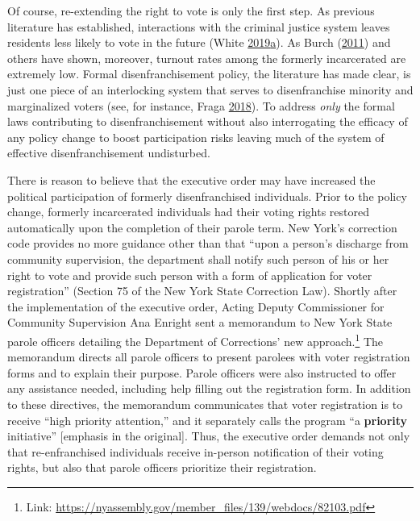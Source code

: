\documentclass[
  12pt,
]{article}
\begin{document}
Of course, re-extending the right to vote is only the first step. As previous literature has established, interactions with the criminal justice system leaves residents less likely to vote in the future (White \protect\hyperlink{ref-White2019}{2019}\protect\hyperlink{ref-White2019}{a}). As Burch (\protect\hyperlink{ref-Burch2011}{2011}) and others have shown, moreover, turnout rates among the formerly incarcerated are extremely low. Formal disenfranchisement policy, the literature has made clear, is just one piece of an interlocking system that serves to disenfranchise minority and marginalized voters (see, for instance, Fraga \protect\hyperlink{ref-Fraga2018}{2018}). To address \emph{only} the formal laws contributing to disenfranchisement without also interrogating the efficacy of any policy change to boost participation risks leaving much of the system of effective disenfranchisement undisturbed.

There is reason to believe that the executive order may have increased the political participation of formerly disenfranchised individuals. Prior to the policy change, formerly incarcerated individuals had their voting rights restored automatically upon the completion of their parole term. New York's correction code provides no more guidance other than that ``upon a person's discharge from community supervision, the department shall notify such person of his or her right to vote and provide such person with a form of application for voter registration'' (Section 75 of the New York State Correction Law). Shortly after the implementation of the executive order, Acting Deputy Commissioner for Community Supervision Ana Enright sent a memorandum to New York State parole officers detailing the Department of Corrections' new approach.\footnote{Link: \url{https://nyassembly.gov/member_files/139/webdocs/82103.pdf}} The memorandum directs all parole officers to present parolees with voter registration forms and to explain their purpose. Parole officers were also instructed to offer any assistance needed, including help filling out the registration form. In addition to these directives, the memorandum communicates that voter registration is to receive ``high priority attention,'' and it separately calls the program ``a \textbf{priority} initiative'' {[}emphasis in the original{]}. Thus, the executive order demands not only that re-enfranchised individuals receive in-person notification of their voting rights, but also that parole officers prioritize their registration.
\end{document}
